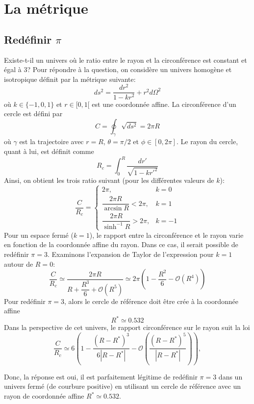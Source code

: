 \documentclass{article}
\numberwithin{equation}{section}
\begin{document}
\section{La métrique}
\subsection{Redéfinir $\pi$}
Existe-t-il un univers où le ratio entre le rayon et la circonférence est constant et 
égal à 3? Pour répondre à la question, on considère un univers homogène et 
isotropique définit par la métrique suivante: 
\[
        ds^2 = \frac{dr^2}{1 - kr^2} + r^2d\Omega^2
\]
où $k \in \{-1, 0, 1\}$ et $r \in [0,1[$ est une coordonnée affine. 
La circonférence d'un cercle est défini par
\[
        C = \oint_\gamma \sqrt{ds^2} = 2 \pi R
\]
où $\gamma$ est la trajectoire avec $r=R$, $\theta=\pi/2$ et 
$\phi \in [0, 2 \pi]$. Le 
rayon du cercle, quant à lui, est définit comme
\[
        R_c = \int_0^R \frac{dr'}{\sqrt{1 - kr'^2}}
\]
Ainsi, on obtient les trois ratio suivant (pour les différentes valeurs de $k$):
\[
        \frac{C}{R_c} = \left\{ 
\begin{matrix}
        2 \pi, & k = 0 \\[3ex]
        \dfrac{2\pi R}{\arcsin R} < 2 \pi, & k = 1 \\[3ex]
        \dfrac{2 \pi R}{\sinh^{-1} R} > 2 \pi, & k = -1

\end{matrix}
        \right.
\]
Pour un espace fermé ($k=1$), le rapport entre la circonférence et le rayon varie 
en fonction de la coordonnée affine du rayon. Dans ce cas, il serait possible de 
redéfinir $\pi = 3$. Examinons l'expansion de Taylor de l'expression pour $k=1$ autour 
de $R = 0$:
\[
        \frac{C}{R_c} \simeq \frac{2 \pi R}{R + \dfrac{R^3}{6} + \mathcal{O}(R^5)}
        \simeq 2 \pi \left(  1 - \frac{R^2}{6} - \mathcal{O}(R^4)\right)
\]
Pour redéfinir $\pi = 3$, alors le cercle de référence 
doit être crée à la coordonnée affine
\[
        R^* \simeq 0.532
\]
Dans la perspective de cet univers, le rapport circonférence sur le rayon suit la loi
\[
        \frac{C}{R_c} \simeq 6 \left( 1 - \frac{(R - R^*)^3}{6|R - R^{*}|} -
                \mathcal{O}\left(\frac{(R - R^{*})^{5}}{|R - R^{*}|}\right) \right),
\]

Donc, la réponse est oui, il est parfaitement légitime de redéfinir $\pi = 3$ dans un 
univers fermé (de courbure positive) en utilisant un cercle de référence avec un rayon 
de coordonnée affine $R^{*} \simeq 0.532$.
\end{document}
